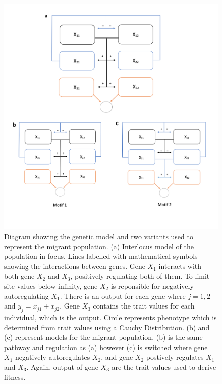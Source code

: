 \begin{figure}
    \begin{center}
        \includegraphics[scale=0.35]{../Results/Model_diagram.jpg}
    \end{center}
    \caption{Diagram showing the genetic model and two variants used to represent the migrant population. (a) Interlocus model of the population in focus. Lines labelled with mathematical symbols showing the interactions between genes. Gene $X_1$ interacts with both gene $X_2$ and $X_3$, positively regulating both of them. To limit site values below infinity, gene $X_2$ is reponsible for negatively autoregulating $X_1$. There is an output for each gene where  $j = {1,2}$ and $y_j = x_{j1} + x_{j2}$. Gene $X_3$ contains the trait values for each individual, which is the output. Circle represents phenotype which is determined from trait values using a Cauchy Distribution. (b) and (c) represent models for the migrant population. (b) is the same pathway and regulation as (a) however (c) is switched where gene $X_1$ negatively autoregulates $X_2$, and gene $X_2$ postively regulates $X_1$ and $X_3$. Again, output of gene $X_3$ are the trait values used to derive fitness.}
    \label{fig:Starting parameters}
\end{figure}
